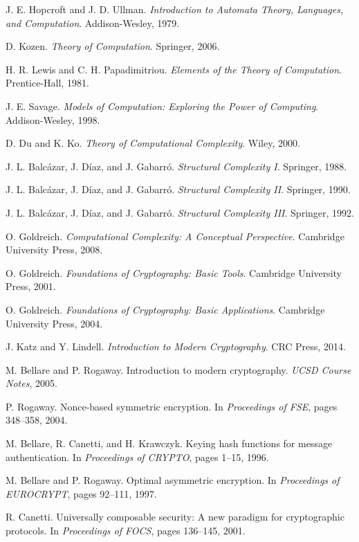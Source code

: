\documentclass[11pt]{article}
\begin{document}
\begin{thebibliography}{99}
 J. E. Hopcroft and J. D. Ullman. \emph{Introduction to Automata Theory, Languages, and Computation}. Addison-Wesley, 1979.

 D. Kozen. \emph{Theory of Computation}. Springer, 2006.

 H. R. Lewis and C. H. Papadimitriou. \emph{Elements of the Theory of Computation}. Prentice-Hall, 1981.

 J. E. Savage. \emph{Models of Computation: Exploring the Power of Computing}. Addison-Wesley, 1998.

 D. Du and K. Ko. \emph{Theory of Computational Complexity}. Wiley, 2000.

 J. L. Balcázar, J. Díaz, and J. Gabarró. \emph{Structural Complexity I}. Springer, 1988.

 J. L. Balcázar, J. Díaz, and J. Gabarró. \emph{Structural Complexity II}. Springer, 1990.

 J. L. Balcázar, J. Díaz, and J. Gabarró. \emph{Structural Complexity III}. Springer, 1992.

 O. Goldreich. \emph{Computational Complexity: A Conceptual Perspective}. Cambridge University Press, 2008.

 O. Goldreich. \emph{Foundations of Cryptography: Basic Tools}. Cambridge University Press, 2001.

 O. Goldreich. \emph{Foundations of Cryptography: Basic Applications}. Cambridge University Press, 2004.

 J. Katz and Y. Lindell. \emph{Introduction to Modern Cryptography}. CRC Press, 2014.

 M. Bellare and P. Rogaway. Introduction to modern cryptography. \emph{UCSD Course Notes}, 2005.

 P. Rogaway. Nonce-based symmetric encryption. In \emph{Proceedings of FSE}, pages 348--358, 2004.

 M. Bellare, R. Canetti, and H. Krawczyk. Keying hash functions for message authentication. In \emph{Proceedings of CRYPTO}, pages 1--15, 1996.

 M. Bellare and P. Rogaway. Optimal asymmetric encryption. In \emph{Proceedings of EUROCRYPT}, pages 92--111, 1997.

 R. Canetti. Universally composable security: A new paradigm for cryptographic protocols. In \emph{Proceedings of FOCS}, pages 136--145, 2001.


\end{thebibliography}
\end{document}
